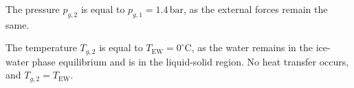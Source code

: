The pressure \( p_{g,2} \) is equal to \( p_{g,1} = 1.4 \, \text{bar}\), as the external forces remain the same.  

The temperature \( T_{g,2} \) is equal to \( T_{\text{EW}} = 0^\circ\text{C}\), as the water remains in the ice-water phase equilibrium and is in the liquid-solid region. No heat transfer occurs, and \( T_{g,2} = T_{\text{EW}} \).